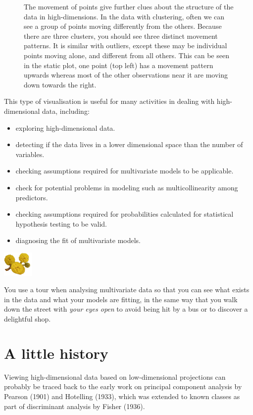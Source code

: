 \documentclass[
  letterpaper,
]{krantz}
\providecommand{\tightlist}{%
  \setlength{\itemsep}{0pt}\setlength{\parskip}{0pt}}\usepackage{longtable,booktabs,array}
\newcommand{\infobox}[1]{%
\noindent\colorbox{info!30}{%
\begin{minipage}{0.98\linewidth}%
    \centering%
    \begin{minipage}[c]{0.15\linewidth} %
      \includegraphics[width=1.5cm]{images/mulga-flowers2.png} %
    \end{minipage}%
    \hfill %
    \begin{minipage}[c]{0.8\linewidth} %
      \bigskip%
      \textsf{#1}%
      \bigskip%
    \end{minipage}%
    \hspace*{3mm}%
  \end{minipage}%
}%
}
\begin{document}
\begin{figure}
\begin{minipage}{0.50\linewidth}
{}


\end{minipage}%

\caption{\label{fig-trails}The movement of points give further clues
about the structure of the data in high-dimensions. In the data with
clustering, often we can see a group of points moving differently from
the others. Because there are three clusters, you should see three
distinct movement patterns. It is similar with outliers, except these
may be individual points moving alone, and different from all others.
This can be seen in the static plot, one point (top left) has a movement
pattern upwards whereas most of the other observations near it are
moving down towards the right.}

\end{figure}%

This type of visualisation is useful for many activities in dealing with
high-dimensional data, including:

\begin{itemize}
\tightlist
\item
  exploring high-dimensional data.
\item
  detecting if the data lives in a lower dimensional space than the
  number of variables.
\item
  checking assumptions required for multivariate models to be
  applicable.
\item
  check for potential problems in modeling such as multicollinearity
  among predictors.
\item
  checking assumptions required for probabilities calculated for
  statistical hypothesis testing to be valid.
\item
  diagnosing the fit of multivariate models.
\end{itemize}

\infobox{You use a tour when analysing multivariate data so that you can see what exists in the data and what your models are fitting, in the same way that you walk down the street with {\em your eyes open} to avoid being hit by a bus or to discover a delightful shop.}

\section{A little history}\label{a-little-history}

Viewing high-dimensional data based on low-dimensional projections can
probably be traced back to the early work on principal component
analysis by Pearson (1901) and Hotelling (1933), which was extended to
known classes as part of discriminant analysis by Fisher (1936).
\end{document}
